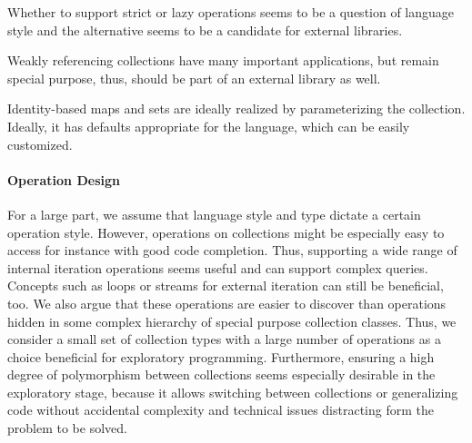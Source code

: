\documentclass[sigconf, 10pt]{acmart}
\begin{document}
Whether to support strict or lazy operations seems
to be a question of language style
and the alternative seems to be a candidate for external libraries.

Weakly referencing collections have many important applications,
but remain special purpose, thus, should be part of an external library as well.

Identity-based maps and sets are ideally realized
by parameterizing the collection.
Ideally, it has defaults appropriate for the language,
which can be easily customized.

\paragraph{Operation Design}

For a large part,
we assume that language style and type dictate a certain operation style.
However, operations on collections might be especially easy to access
for instance with good code completion.
Thus, supporting a wide range of internal iteration operations seems useful
and can support complex queries.
Concepts such as loops or streams for external iteration
can still be beneficial, too.
We also argue that these operations are easier to discover
than operations hidden in some complex hierarchy
of special purpose collection classes.
Thus, we consider a small set of collection types
with a large number of operations
as a choice beneficial for exploratory programming.
%
Furthermore, ensuring a high degree of polymorphism between collections
seems especially desirable in the exploratory stage,
because it allows switching between collections or generalizing code
without accidental complexity and technical issues distracting form the problem to be solved.
\end{document}
